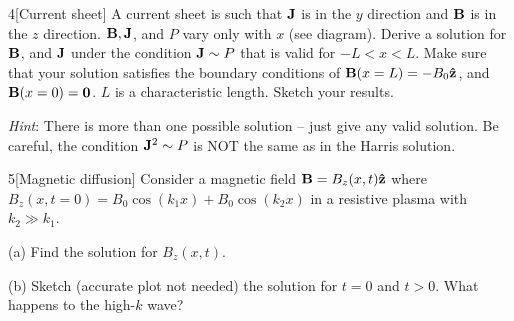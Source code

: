 \documentclass[12pt]{article}
\begin{document}
\begin{problem}{4}[Current sheet]
A current sheet is such that $\vb{J}$ is in the $y$ direction and $\vb{B}$ is in
the $z$ direction. $\vb{B},\vb{J}$, and $P$ vary only with $x$ (see diagram).
Derive a solution for $\vb{B}$, and $\vb{J}$ under the condition $\vb{J}\sim P$
that is valid for $-L<x<L$. Make sure that your solution satisfies the boundary
conditions of $\vb{B}(x=L)=-B_0\vb{\hat{z}}$, and $\vb{B}(x=0)=\vb{0}$. $L$
is a characteristic length. Sketch your results.

\textit{Hint}: There is more than one possible solution -- just give any valid
solution. Be careful, the condition $\vb{J}^2\sim P$ is NOT the same as in the
Harris solution. 
\end{problem}
\begin{problem}{5}[Magnetic diffusion]
Consider a magnetic field $\vb{B}=B_z(x,t)\vb{\hat{z}}$ where
$B_z(x,t=0)=B_0\cos(k_1x)+B_0\cos(k_2x)$ in a resistive plasma with $k_2\gg
k_1$.

(a) Find the solution for $B_z(x,t)$.

(b) Sketch (accurate plot not needed) the solution for $t=0$ and $t>0$. What
happens to the high-$k$ wave?
\end{problem}
\end{document}
